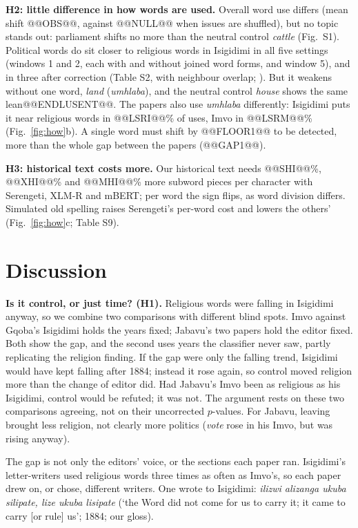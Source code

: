 \documentclass[10pt,letterpaper]{article}
\begin{document}
\textbf{H2: little difference in how words are used.} Overall word use differs (mean shift @@OBS@@, against @@NULL@@ when issues are shuffled), but no topic stands out: parliament shifts no more than the neutral control \emph{cattle} (Fig.~S1). Political words do sit closer to religious words in Isigidimi in all five settings (windows 1 and 2, each with and without joined word forms, and window 5), and in three after correction (Table S2, with neighbour overlap; \citealp{gonen2020}). But it weakens without one word, \emph{land} (\emph{umhlaba}), and the neutral control \emph{house} shows the same lean@@ENDLUSENT@@. The papers also use \emph{umhlaba} differently: Isigidimi puts it near religious words in @@LSRI@@\% of uses, Imvo in @@LSRM@@\% (Fig.~\ref{fig:how}b). A single word must shift by @@FLOOR1@@ to be detected, more than the whole gap between the papers (@@GAP1@@).

\textbf{H3: historical text costs more.} Our historical text needs @@SHI@@\%, @@XHI@@\% and @@MHI@@\% more subword pieces per character with Serengeti, XLM-R and mBERT; per word the sign flips, as word division differs. Simulated old spelling raises Serengeti's per-word cost and lowers the others' (Fig.~\ref{fig:how}c; Table S9).

\section{Discussion}
\textbf{Is it control, or just time? (H1).} Religious words were falling in Isigidimi anyway, so we combine two comparisons with different blind spots. Imvo against Gqoba's Isigidimi holds the years fixed; Jabavu's two papers hold the editor fixed. Both show the gap, and the second uses years the classifier never saw, partly replicating the religion finding. If the gap were only the falling trend, Isigidimi would have kept falling after 1884; instead it rose again, so control moved religion more than the change of editor did. Had Jabavu's Imvo been as religious as his Isigidimi, control would be refuted; it was not. The argument rests on these two comparisons agreeing, not on their uncorrected $p$-values. For Jabavu, leaving brought less religion, not clearly more politics (\emph{vote} rose in his Imvo, but was rising anyway).

The gap is not only the editors' voice, or the sections each paper ran. Isigidimi's letter-writers used religious words three times as often as Imvo's, so each paper drew on, or chose, different writers. One wrote to Isigidimi: \emph{ilizwi alizanga ukuba silipate, lize ukuba lisipate} (`the Word did not come for us to carry it; it came to carry [or rule] us'; 1884; our gloss).
\end{document}
